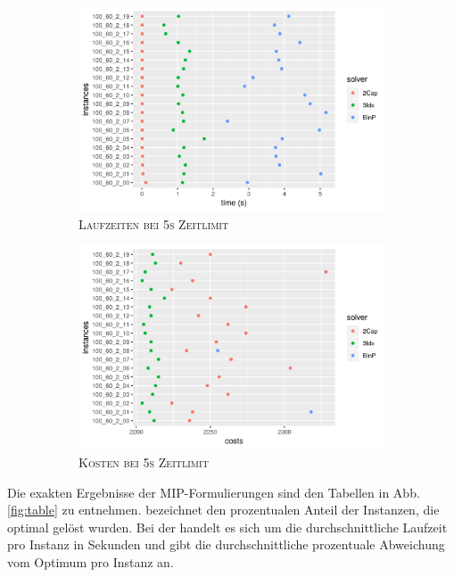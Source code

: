 \begin{figure}[H]
\centering
\begin{subfigure}[b]{0.4\textwidth}
\centering
\includegraphics[width=1.3\textwidth]{img/solver_instance_time_b=2_s_5s.png}
\caption{\textsc{Laufzeiten bei 5s Zeitlimit}}
\label{fig:b=2_s_runtimes}
\end{subfigure}
\hfill
\begin{subfigure}[b]{0.4\textwidth}
\centering
\includegraphics[width=1.3\textwidth]{img/solver_instance_cost_b=2_s_5s.png}
\caption{\textsc{Kosten bei 5s Zeitlimit}}
\label{fig:b=2_s_costs}
\end{subfigure}
\caption{}
\end{figure}

Die exakten Ergebnisse der MIP-Formulierungen sind den Tabellen in Abb. \ref{fig:table} zu entnehmen.
 bezeichnet den prozentualen Anteil der Instanzen, die optimal gelöst wurden. Bei der  handelt
es sich um die durchschnittliche Laufzeit pro Instanz in Sekunden und  gibt die durchschnittliche prozentuale Abweichung
vom Optimum pro Instanz an.

